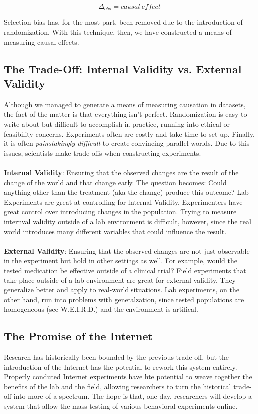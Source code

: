 \begin{equation}
  \Delta_{obs} = causal\ effect 
\end{equation}

Selection bias has, for the most part, been removed due to the introduction of randomization. With this technique, then, we have constructed a means of measuring causal effects.

\subsection{The Trade-Off: Internal Validity vs. External Validity}
Although we managed to generate a means of measuring causation in datasets, the fact of the matter is that everything isn't perfect. Randomization is easy to write about but difficult to accomplish in practice, running into ethical or feasibility concerns. Experiments often are costly and take time to set up. Finally, it is often \textit{painstakingly difficult} to create convincing parallel worlds. Due to this issues, scientists make trade-offs when constructing experiments. \\ \\

\textbf{Internal Validity}: Ensuring that the observed changes are the result of the change of the world and that change early. The question becomes: Could anything other than the treatment (aka the change) produce this outcome? Lab Experiments are great at controlling for Internal Validity. Experimenters have great control over introducing changes in the population. Trying to measure internval validity outside of a lab environment is difficult, however, since the real world introduces many different variables that could influence the result. \\ \\

\textbf{External Validity}: Ensuring that the observed changes are not just observable in the experiment but hold in other settings as well. For example, would the tested medication be effective outside of a clinical trial? Field experiments that take place outside of a lab environment are great for external validity. They generalize better and apply to real-world situations. Lab experiments, on the other hand, run into problems with generalzation, since tested populations are homogeneous (see W.E.I.R.D.) and the environment is artifical.

\subsection{The Promise of the Internet}
Research has historically been bounded by the previous trade-off, but the introduction of the Internet has the potential to rework this system entirely. Properly conduted Internet experiments have hte potential to weave together the benefits of the lab and the field, allowing researchers to turn the historical trade-off into more of a spectrum. The hope is that, one day, researchers will develop a system that allow the mass-testing of various behavioral experiments online.

